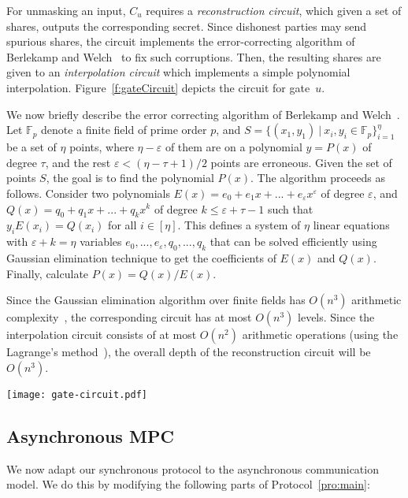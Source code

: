 \documentclass[11pt,letter]{article}
\theoremstyle{mytheoremstyle}
\let\savedCaption=\caption
\renewcommand*{\caption}[1]{\savedCaption[#1]{~#1}}
\begin{document}
For unmasking an input, $C_u$ requires a \emph{reconstruction circuit}, which given a set of shares, outputs the corresponding secret. Since dishonest parties may send spurious shares, the circuit implements the error-correcting algorithm of Berlekamp and Welch~\cite{Berlekamp:Welch:1986} to fix such corruptions. Then, the resulting shares are given to an \emph{interpolation circuit} which implements a simple polynomial interpolation. Figure~\ref{f:gateCircuit} depicts the circuit for gate~$u$.

We now briefly describe the error correcting algorithm of Berlekamp and Welch~\cite{Berlekamp:Welch:1986}. Let $\mathbb{F}_{p}$ denote a finite field of prime order $p$, and $S=\{(x_{1},y_{1})\:|\:x_{i},y_{i}\in\mathbb{F}_{p}\}_{i=1}^{\eta}$ be a set of $\eta$ points, where $\eta-\varepsilon$ of them are on a polynomial $y=P(x)$ of degree $\tau$, and the rest $\varepsilon<(\eta-\tau+1)/2$ points are erroneous. Given the set of points $S$, the goal is to
find the polynomial $P(x)$. The algorithm proceeds as follows. Consider two polynomials $E(x)=e_{0}+e_{1}x+...+e_{\varepsilon}x^{\varepsilon}$ of degree $\varepsilon$, and $Q(x)=q_{0}+q_{1}x+...+q_{k}x^{k}$ of degree $k\leq\varepsilon+\tau-1$ such that $y_{i}E(x_{i})=Q(x_{i})$
for all $i\in[\eta]$. This defines a system of $\eta$ linear equations with $\varepsilon+k=\eta$ variables $e_{0},...,e_{\varepsilon},q_{0},...,q_{k}$ that can be solved efficiently using Gaussian elimination technique
to get the coefficients of $E(x)$ and $Q(x)$. Finally, calculate $P(x)=Q(x)/E(x)$.

Since the Gaussian elimination algorithm over finite fields has $O(n^3)$ arithmetic complexity~\cite{1988linear}, the corresponding circuit has at most $O(n^3)$ levels. Since the interpolation circuit consists of at most $O(n^2)$ arithmetic operations (using the Lagrange's method~\cite{Abramowitz:1974:HMF:1098650}), the overall depth of the reconstruction circuit will be $O(n^3)$.

\begin{figure*}[t]
	\begin{center}
		\texttt{[image: gate-circuit.pdf]}
	\end{center}
	\caption{Circuit of gate $u$}
	\label{f:gateCircuit}
\end{figure*}

\subsection{Asynchronous MPC}
We now adapt our synchronous protocol to the asynchronous communication model. We do this by modifying the following parts of Protocol~\ref{pro:main}:
\end{document}
